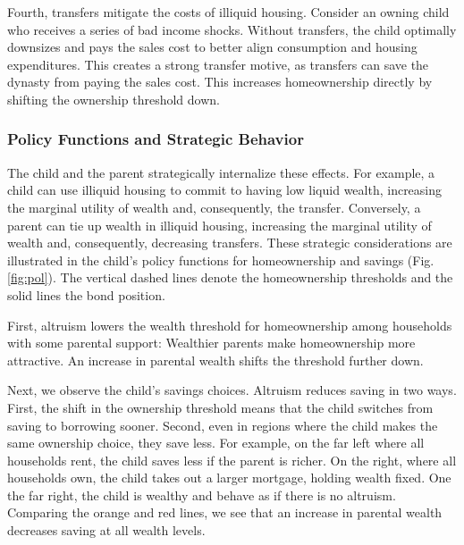 \documentclass[12pt]{article}
\begin{document}
Fourth, transfers mitigate the costs of illiquid housing. Consider an owning child who receives a series of bad income shocks. Without transfers, the child optimally downsizes and pays the sales cost to better align consumption and housing expenditures. This creates a strong transfer motive, as transfers can save the dynasty from paying the sales cost. This increases homeownership directly by shifting the ownership threshold down.

\subsubsection{Policy Functions and Strategic Behavior}\label{sec:policyfuncs}
The child and the parent strategically internalize these effects. For example, a child can use illiquid housing to commit to having low liquid wealth, increasing the marginal utility of wealth and, consequently, the transfer. Conversely, a parent can tie up wealth in illiquid housing, increasing the marginal utility of wealth and, consequently, decreasing transfers. These strategic considerations are illustrated in the child's policy functions for homeownership and savings (Fig. \ref{fig:pol}). The vertical dashed lines denote the homeownership thresholds and the solid lines the bond position.

First, altruism lowers the wealth threshold for homeownership among households with some parental support: Wealthier parents make homeownership more attractive. An increase in parental wealth shifts the threshold further down.

Next, we observe the child's savings choices. Altruism reduces saving in two ways. First, the shift in the ownership threshold means that the child switches from saving to borrowing sooner. Second, even in regions where the child makes the same ownership choice, they save less. For example, on the far left where all households rent, the child saves less if the parent is richer. On the right, where all households own, the child takes out a larger mortgage, holding wealth fixed. One the far right, the child is wealthy and behave as if there is no altruism. Comparing the orange and red lines, we see that an increase in parental wealth decreases saving at all wealth levels.
\end{document}
